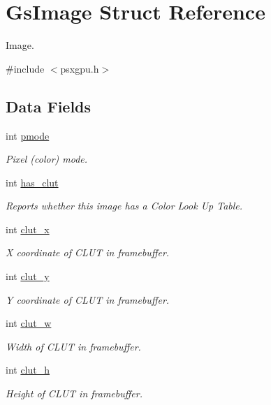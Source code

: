 \hypertarget{structGsImage}{}\section{Gs\+Image Struct Reference}
\label{structGsImage}


Image.  




{\ttfamily \#include $<$psxgpu.\+h$>$}

\subsection*{Data Fields}
\begin{DoxyCompactItemize}
\item 
int \hyperlink{structGsImage_a2a97f495c717e8dad31ea67e87945f5e}{pmode}
\begin{DoxyCompactList}\small\item\em Pixel (color) mode. \end{DoxyCompactList}\item 
int \hyperlink{structGsImage_a08d650746c51afda8d4e3bca004bba33}{has\+\_\+clut}
\begin{DoxyCompactList}\small\item\em Reports whether this image has a Color Look Up Table. \end{DoxyCompactList}\item 
int \hyperlink{structGsImage_a95c9c337ddbe24c03106d5df8c35e526}{clut\+\_\+x}
\begin{DoxyCompactList}\small\item\em X coordinate of C\+L\+UT in framebuffer. \end{DoxyCompactList}\item 
int \hyperlink{structGsImage_a9510563579c7ba86176a601d2adbe0c0}{clut\+\_\+y}
\begin{DoxyCompactList}\small\item\em Y coordinate of C\+L\+UT in framebuffer. \end{DoxyCompactList}\item 
int \hyperlink{structGsImage_a63347602889c710a8f2e21b71f82038f}{clut\+\_\+w}
\begin{DoxyCompactList}\small\item\em Width of C\+L\+UT in framebuffer. \end{DoxyCompactList}\item 
int \hyperlink{structGsImage_a26eca2ce5193f47874aada8354cafb80}{clut\+\_\+h}
\begin{DoxyCompactList}\small\item\em Height of C\+L\+UT in framebuffer. \end{DoxyCompactList}\item 

\end{DoxyCompactItemize}
